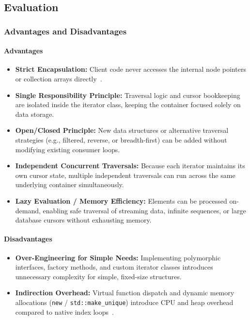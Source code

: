\subsection{Evaluation}

\subsubsection{Advantages and Disadvantages}

\paragraph{Advantages}
\begin{itemize}
    \item \textbf{Strict Encapsulation:} Client code never accesses the internal node pointers or collection arrays directly~\cite{gof1994}.
    \item \textbf{Single Responsibility Principle:} Traversal logic and cursor bookkeeping are isolated inside the iterator class, keeping the container focused solely on data storage.
    \item \textbf{Open/Closed Principle:} New data structures or alternative traversal strategies (e.g., filtered, reverse, or breadth-first) can be added without modifying existing consumer loops.
    \item \textbf{Independent Concurrent Traversals:} Because each iterator maintains its own cursor state, multiple independent traversals can run across the same underlying container simultaneously.
    \item \textbf{Lazy Evaluation / Memory Efficiency:} Elements can be processed on-demand, enabling safe traversal of streaming data, infinite sequences, or large database cursors without exhausting memory.
\end{itemize}

\paragraph{Disadvantages}
\begin{itemize}
    \item \textbf{Over-Engineering for Simple Needs:} Implementing polymorphic interfaces, factory methods, and custom iterator classes introduces unnecessary complexity for simple, fixed-size structures.
    \item \textbf{Indirection Overhead:} Virtual function dispatch and dynamic memory allocations (\texttt{new} / \texttt{std::make\_unique}) introduce CPU and heap overhead compared to native index loops~\cite{stroustrup2013}.
\end{itemize}

